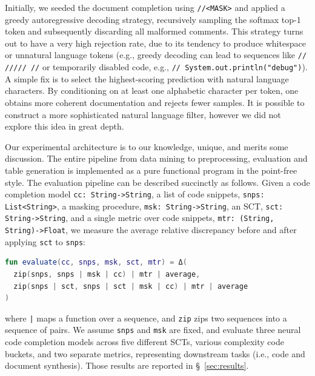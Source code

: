 \documentclass[usenames,dvipsnames]{article} %
\begin{document}
Initially, we seeded the document completion using \lstinline|//<MASK>| and applied a greedy autoregressive decoding strategy, recursively sampling the softmax top-1 token and subsequently discarding all malformed comments. This strategy turns out to have a very high rejection rate, due to its tendency to produce whitespace or unnatural language tokens (e.g., greedy decoding can lead to sequences like \lstinline|// ///// //| or temporarily disabled code, e.g., \lstinline|// System.out.println("debug")|). A simple fix is to select the highest-scoring prediction with natural language characters. By conditioning on at least one alphabetic character per token, one obtains more coherent documentation and rejects fewer samples. It is possible to construct a more sophisticated natural language filter, however we did not explore this idea in great depth.

Our experimental architecture is to our knowledge, unique, and merits some discussion. The entire pipeline from data mining to preprocessing, evaluation and table generation is implemented as a pure functional program in the point-free style. The evaluation pipeline can be described succinctly as follows. Given a code completion model \lstinline|cc: String->String|, a list of code snippets, \lstinline|snps: List<String>|, a masking procedure, \lstinline|msk: String->String|, an SCT, \lstinline|sct: String->String|, and a single metric over code snippets, \lstinline|mtr: (String, String)->Float|, we measure the average relative discrepancy before and after applying \lstinline|sct| to \lstinline|snps|:

\noindent\begin{lstlisting}[basicstyle=\footnotesize\ttfamily, language=kotlin,label={lst:lstlisting}]
fun evaluate(cc, snps, msk, sct, mtr) = Δ(
  zip(snps, snps | msk | cc) | mtr | average,
  zip(snps | sct, snps | sct | msk | cc) | mtr | average
)
\end{lstlisting}

\noindent where \texttt{|} maps a function over a sequence, and \lstinline|zip| zips two sequences into a sequence of pairs. We assume \lstinline|snps| and \lstinline|msk| are fixed, and evaluate three neural code completion models across five different SCTs, various complexity code buckets, and two separate metrics, representing downstream tasks (i.e., code and document synthesis). Those results are reported in \S~\ref{sec:results}.
\end{document}
